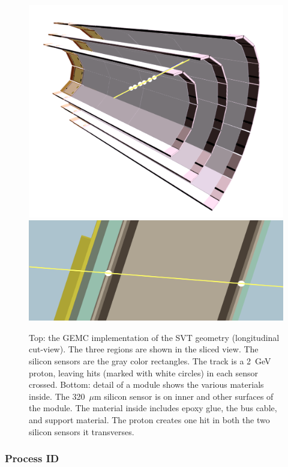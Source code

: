 \begin{figure}[ht]
	\centering
	\includegraphics[width=0.99\columnwidth,keepaspectratio]{img/bstGeometry.png}
	\includegraphics[width=0.99\columnwidth,keepaspectratio]{img/bstDetail.png}
	\caption{Top: the GEMC implementation of the SVT geometry (longitudinal cut-view). The three regions are shown
          in the sliced view. The silicon sensors are the gray color rectangles. The track is a 2~GeV proton, leaving hits
          (marked with white circles) in each sensor crossed. Bottom: detail of a module shows the various materials inside.
          The 320~$\mu$m silicon sensor is on inner and other surfaces of the module. The material inside includes epoxy
          glue, the bus cable, and support material. The proton creates one hit in both the two silicon sensors it transverses.}
	\label{fig:bstGeometry}
\end{figure}

\subsubsection{Process ID}

